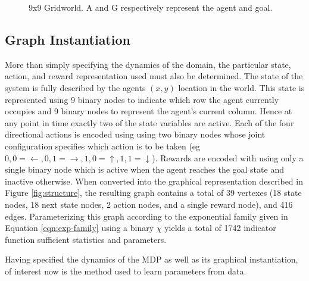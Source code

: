 \documentclass{article} %
\begin{document}
\begin{figure}
\center
{}
\caption{9x9 Gridworld. A and G respectively represent the agent and goal.}
\label{fig:gridworld}
\end{figure}

\subsection{Graph Instantiation}
More than simply specifying the dynamics of the domain, the particular state, action, and reward representation used must also be determined. The state of the system is fully described by the agents $(x,y)$ location in the world. This state is represented using 9 binary nodes to indicate which row the agent currently occupies and 9 binary nodes to represent the agent's current column. Hence at any point in time exactly two of the state variables are active. Each of the four directional actions is encoded using using two binary nodes whose joint configuration specifies which action is to be taken (eg $0,0=\leftarrow, 0,1=\rightarrow, 1,0=\uparrow, 1,1=\downarrow$). Rewards are encoded with using only a single binary node which is active when the agent reaches the goal state and inactive otherwise. When converted into the graphical representation described in Figure \ref{fig:structure}, the resulting graph contains a total of 39 vertexes (18 state nodes, 18 next state nodes, 2 action nodes, and a single reward node), and 416 edges. Parameterizing this graph according to the exponential family given in Equation \ref{eqn:exp-family} using a binary $\chi$ yields a total of 1742 indicator function sufficient statistics and parameters.

Having specified the dynamics of the MDP as well as its graphical instantiation, of interest now is the method used to learn parameters from data.
\end{document}
